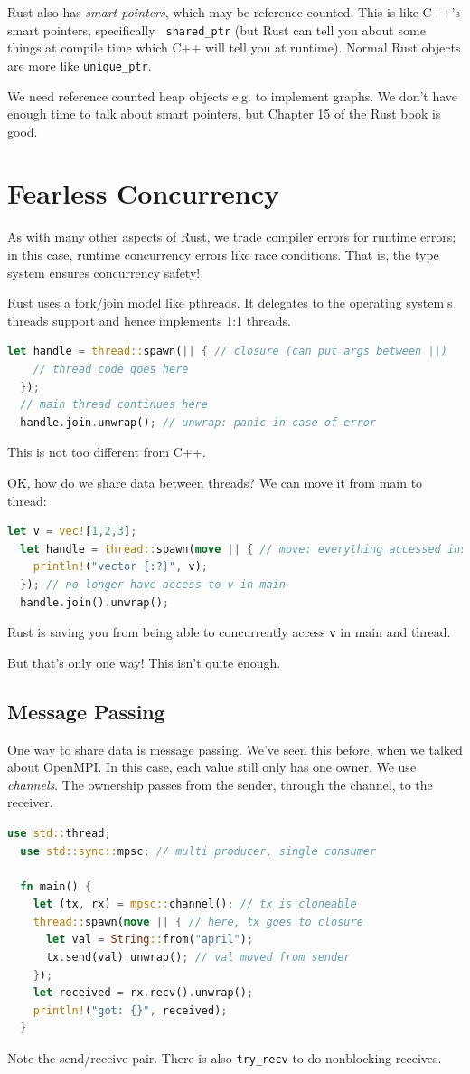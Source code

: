 \documentclass[a4paper]{report}
\begin{document}
Rust also has \emph{smart pointers}, which may be reference
counted. This is like C++'s smart pointers, specifically {\tt
  shared\_ptr} (but Rust can tell you about some things at compile
time which C++ will tell you at runtime). Normal Rust objects are more
like {\tt unique\_ptr}.

We need reference counted heap objects e.g. to implement graphs. We don't have
enough time to talk about smart pointers, but Chapter 15 of the Rust book is good.

\section*{Fearless Concurrency}
As with many other aspects of Rust, we trade compiler errors for runtime
errors; in this case, runtime concurrency errors like race conditions.
That is, the type system ensures concurrency safety!

Rust uses a fork/join model like pthreads. It delegates to the operating
system's threads support and hence implements 1:1 threads.
\begin{lstlisting}[language=Rust]
  let handle = thread::spawn(|| { // closure (can put args between ||)
    // thread code goes here
  });
  // main thread continues here
  handle.join.unwrap(); // unwrap: panic in case of error
\end{lstlisting}
This is not too different from C++.

OK, how do we share data between threads? We can move it from main to thread:
\begin{lstlisting}[language=Rust]
  let v = vec![1,2,3];
  let handle = thread::spawn(move || { // move: everything accessed inside closure is moved
    println!("vector {:?}", v);
  }); // no longer have access to v in main
  handle.join().unwrap();
\end{lstlisting}
Rust is saving you from being able to concurrently access {\tt v} in main and thread.

But that's only one way! This isn't quite enough.

\subsection*{Message Passing}
One way to share data is message passing. We've seen this before, when we talked about OpenMPI.
In this case, each value still only has one owner. We use \emph{channels}. The ownership passes
from the sender, through the channel, to the receiver.
\begin{lstlisting}[language=Rust]
  use std::thread;
  use std::sync::mpsc; // multi producer, single consumer

  fn main() {
    let (tx, rx) = mpsc::channel(); // tx is cloneable
    thread::spawn(move || { // here, tx goes to closure
      let val = String::from("april");
      tx.send(val).unwrap(); // val moved from sender
    });
    let received = rx.recv().unwrap();
    println!("got: {}", received);
  }
\end{lstlisting}
Note the send/receive pair. There is also {\tt try\_recv} to do nonblocking receives.
\end{document}
